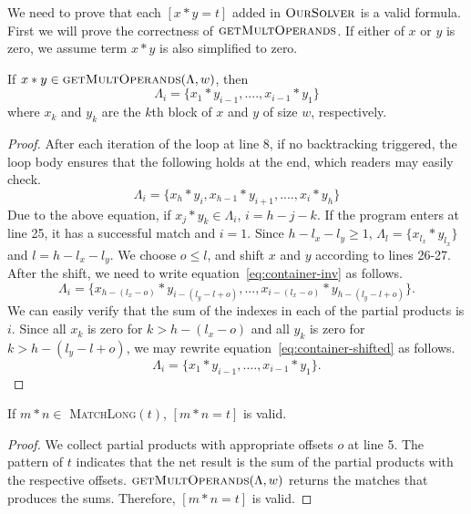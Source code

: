 We need to prove that each $[x*y = t]$ added in $\textsc{OurSolver}$
is a valid formula.
%
First we will prove the correctness of $\textsc{getMultOperands}$.
%
If either of $x$ or $y$ is zero, we assume term $x*y$ is also simplified to zero.
\begin{thm}
 If $ x*y \in \textsc{getMultOperands}(\Lambda,w)$, then
 $$
 \Lambda_i = \{ x_1*y_{i-1},....,x_{i-1}*y_1 \}
 $$
  where $x_k$ and $y_k$ are the $k$th block of $x$ and $y$ of size
$w$, respectively.
\end{thm}
\begin{proof}
  After each iteration of the loop at line 8,
  if no backtracking triggered, the loop body ensures
  that the following holds at the end, which readers may easily check.
  \begin{equation}
    \label{eq:container-inv}
  \Lambda_i = \{ x_h*y_{i}, x_{h-1}*y_{i+1},....,x_{i}*y_h \}    
  \end{equation}
  Due to the above equation,
  if $x_j*y_k \in \Lambda_i$, $ i = h-j-k$.
  If the program enters at line 25, it has a successful match and $i=1$.
  Since $h-l_x -l_y \geq 1$, $\Lambda_l = \{x_{l_x}*y_{l_x}\}$
  and $l = h - l_x - l_y$.
  We choose $o \leq l$, and shift $x$ and $y$ according to lines 26-27.
  After the shift, we need to write equation~\eqref{eq:container-inv}
  as follows.
  \begin{equation}
    \label{eq:container-shifted}
    \Lambda_i = \{ x_{h-(l_x-o)}*y_{i-(l_y-l+o)},...,x_{i-(l_x-o)}*y_{h-(l_y-l+o)} \}.
  \end{equation}
  We can easily verify that the sum of the indexes in each of
  the partial products is $i$.
  Since all $x_k$ is zero for $k > h-(l_x-o)$ and all $y_k$ is zero
  for $k > h-(l_y-l+o)$,
  we may rewrite equation~\eqref{eq:container-shifted}
 as follows.
  $$
  \Lambda_i = \{ x_1*y_{i-1},....,x_{i-1}*y_1 \}.
  $$
\end{proof}

\begin{thm}
  If $m*n\in$ \textsc{MatchLong}$(t)$, $[m*n = t]$ is valid.
\end{thm}
\begin{proof}
  We collect partial products with appropriate offsets $o$ at line 5.
  The pattern of $t$ indicates that the net result is the sum of the 
  partial products with the respective offsets. 
  $\textsc{getMultOperands}(\Lambda,w)$ returns the
  matches that produces the sums.
  Therefore, $[m*n = t]$ is valid.
\end{proof}

